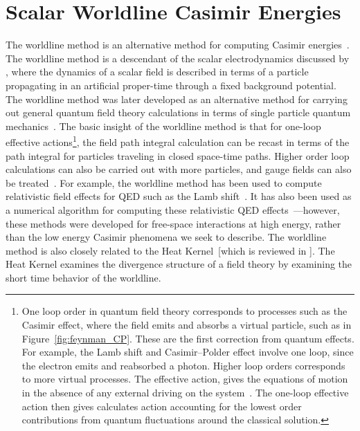 \section{Scalar Worldline Casimir Energies}
\label{sec:dirichlet_worldline}
The worldline method is an alternative method for computing Casimir energies~\citep{Gies2003}.
The worldline method is a descendant of the scalar electrodynamics 
discussed by \citet{Feynman1950}, where the dynamics of a scalar field 
is described in terms of a particle propagating in an artificial proper-time through a fixed background potential. 
The worldline method was later developed as an alternative method for 
carrying out general quantum field theory calculations in terms of single particle 
quantum mechanics~\citep{McKeon1993, Strassler1992,Schubert2001}.  
The basic insight of the worldline method is that for one-loop effective actions\footnote{
One loop order in quantum field theory corresponds to processes such as the Casimir effect,
where the field emits and absorbs a virtual particle, such as in Figure~\ref{fig:feynman_CP}.  
These are the first correction from quantum effects.  For example, the Lamb shift and Casimir--Polder 
effect involve one loop, since the electron emits and reabsorbed a photon.  Higher loop orders 
corresponds to more virtual processes.  
The effective action, gives the equations of motion in the absence of any external driving on the system~\citep[Ch. 16]{WeinbergQFT2}.  
The one-loop effective action then gives calculates action accounting for the lowest order contributions from quantum fluctuations
around the classical solution.}, 
the field path integral calculation can be recast in terms of the path
 integral for particles traveling in closed space-time paths.
  Higher order loop calculations can also be carried out with more particles, 
and gauge fields can also be treated~\citep{Schubert2001}.
For example, the worldline method has been used to compute relativistic
field effects for QED such as the Lamb shift~\citep{Schmidt1995}.  
It has also been used as a numerical algorithm for computing these relativistic 
QED effects~\citep{Mazur2014}---however, these methods were developed for free-space interactions at high energy, rather than the 
low energy Casimir phenomena we seek to describe.  
The worldline method is also closely related to the Heat Kernel~[which is reviewed in \citet{Vassilevich2003}].
The Heat Kernel examines the divergence structure of a field theory by examining the short time behavior of the 
worldline.  


